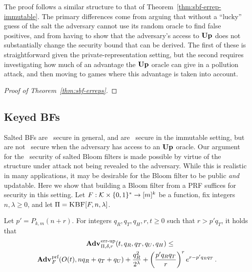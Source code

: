 The proof follows a similar structure to that of
Theorem~\ref{thm:sbf-errep-immutable}. The primary differences come from arguing
that without a ``lucky'' guess of the salt the adversary cannot use its random
oracle to find false positives, and from having to show that the adversary's
access to $\textup{\textbf{Up}}\hspace{0.5pt}$ does not substantially change the security bound that can be
derived. The first of these is straightforward given the private-representation
setting, but the second requires investigating how much of an advantage the
$\textup{\textbf{Up}}\hspace{0.5pt}$ oracle can give in a pollution attack, and then moving to games where
this advantage is taken into account.

\begin{proof}[Proof of Theorem~\ref{thm:sbf-erreps}]
  
\end{proof}

\subsection{Keyed BFs}

Salted BFs are \erreps\ secure in general, and are \errep\ secure in the
immutable setting, but are not \errep\ secure when the adversary has access to
an $\textup{\textbf{Up}}\hspace{0.5pt}$ oracle. Our argument for the \erreps\ security of
salted Bloom filters is made possible by virtue of the structure under attack
not being revealed to the adversary. While this is realistic in many
applications, it may be desirable for the Bloom filter to be public \emph{and}
updatable.
%
Here we show that building a Bloom filter from a PRF suffices for security in
this setting.
%
Let $F:\mathcal{K}\times\{0,1\}^*\to[m]^k$ be a function, fix
integers~$n,\lambda\geq0$, and let $\Pi = \textnormal{\textsc{KBF}}[F,n,\lambda]$.

\begin{theorem}\label{thm:bf-key-bound}
  Let $p' = P_{k,m}(n+r)$.  For integers $q_R, q_T, q_H, r, t \geq 0$ such that
  $r > p'q_T$, it holds that
  \begin{equation*}
    \begin{aligned}
      \Adv{\errep}_{\Pi,\delta,r}(t,\,&q_R,q_T,q_U,q_H) \leq \\
        \Adv{\prf}_F(O(t),nq_R+q_T+q_U) & +
      \frac{q_R^2}{2^\lambda} +
      \left(\frac{p'q_Rq_T}{r}\right)^re^{r-p'q_Rq_T} \,.
    \end{aligned}
  \end{equation*}
\end{theorem}

